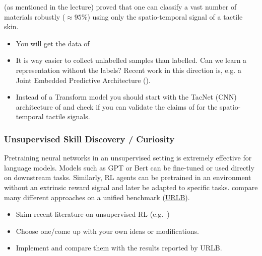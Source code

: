 \documentclass[a4paper]{article}
\begin{document}
\citet{Tulbure2018} (as mentioned in the lecture) proved that one can classify a vast number of materials robustly ($\approx 95 \%$) using only the spatio-temporal signal of a tactile skin.

\begin{itemize}
  \item You will get the data of \citet{Tulbure2018}
  \item It is way easier to collect unlabelled samples than labelled. Can we learn a representation without the labels? Recent work in this direction is, e.g. a Joint Embedded Predictive Architecture (\citet{assran2023selfsupervised}).
  \item Instead of a Transform model you should start with the TacNet (CNN) architecture of \citet{Tulbure2018} and check if you can validate the claims of \citet{assran2023selfsupervised} for the spatio-temporal tactile signals. 
\end{itemize}

%


\subsubsection{Unsupervised Skill Discovery / Curiosity}
Pretraining neural networks in an unsupervised setting is extremely effective for language models. Models such as GPT or Bert can be fine-tuned or used directly on downstream tasks.
Similarly, RL agents can be pretrained in an environment without an extrinsic reward signal and later be adapted to specific tasks.
\citet{Laskin2021} compare many different approaches on a unified benchmark (\href{https://github.com/rll-research/url_benchmark}{URLB}).
\begin{itemize}
  \item Skim recent literature on unsupervised RL (e.g.~\cite{Hafner2023, Laskin2022, Li2023InternalReward})
  \item Choose one/come up with your own ideas or modifications.
  \item Implement and compare them with the results reported by URLB.
\end{itemize}
\end{document}
